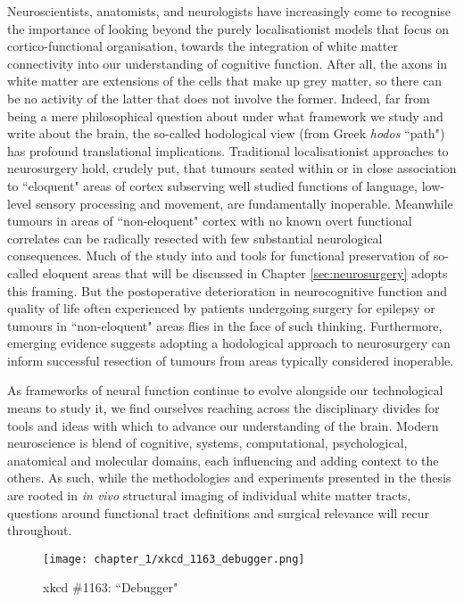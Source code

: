 Neuroscientists, anatomists, and neurologists have increasingly come to recognise the importance of looking beyond the purely localisationist models that focus on cortico-functional organisation, towards the integration of white matter connectivity into our understanding of cognitive function.\autocite{ffytche2005,Catani2007}
After all, the axons in white matter are extensions of the cells that make up grey matter, so there can be no activity of the latter that does not involve the former.
Indeed, far from being a mere philosophical question about under what framework we study and write about the brain, the so-called hodological view (from Greek \textit{hodos} ``path") has profound translational implications.
Traditional localisationist approaches to neurosurgery hold, crudely put, that tumours seated within or in close association to ``eloquent" areas of cortex subserving well studied functions of language, low-level sensory processing and movement, are fundamentally inoperable.
Meanwhile tumours in areas of ``non-eloquent" cortex with no known overt functional correlates can be radically resected with few substantial neurological consequences.
Much of the study into and tools for functional preservation of so-called eloquent areas that will be discussed in Chapter \ref{sec:neurosurgery} adopts this framing.
But the postoperative deterioration in neurocognitive function and quality of life often experienced by patients undergoing surgery for epilepsy or tumours in ``non-eloquent" areas flies in the face of such thinking.
\autocite{Satoer2017,Mandonnet2017a,Rijnen2019,Herbet2019,Vigren2020a,Dadario2021}
Furthermore, emerging evidence suggests adopting a hodological approach to neurosurgery can inform successful resection of tumours from areas typically considered inoperable\autocite{Dadario2021,DeBenedictis2011b,Suzuki2023}.

As frameworks of neural function continue to evolve alongside our technological means to study it, we find ourselves reaching across the disciplinary divides for tools and ideas with which to advance our understanding of the brain.
Modern neuroscience is blend of cognitive, systems, computational, psychological, anatomical and molecular domains, each influencing and adding context to the others.
As such, while the methodologies and experiments presented in the thesis are rooted in \textit{in vivo} structural imaging of individual white matter tracts, questions around functional tract definitions and surgical relevance will recur throughout.

\begin{figure}[hb!]
  \centering
  \texttt{[image: chapter\_1/xkcd\_1163\_debugger.png]}
  \caption{xkcd \#1163: ``Debugger"}
  \label{fig:xkcd}
\end{figure}

